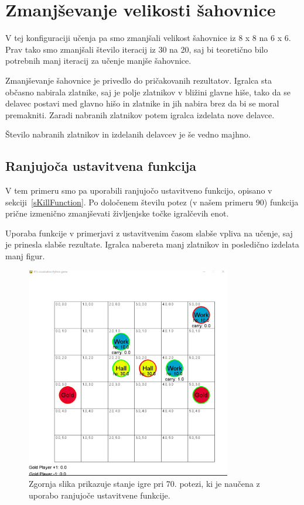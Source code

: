 \documentclass[a4paper, 12pt]{book}
\begin{document}
\section{Zmanjševanje velikosti šahovnice}
\label{resultFourth}

V tej konfiguraciji učenja pa smo zmanjšali velikost šahovnice iz 8 x 8 na 6 x 6.
Prav tako smo zmanjšali število iteracij iz 30 na 20, saj bi teoretično bilo potrebnih manj iteracij za učenje manjše šahovnice.

Zmanjševanje šahovnice je privedlo do pričakovanih rezultatov.
Igralca sta občasno nabirala zlatnike, saj je polje zlatnikov v bližini glavne hiše, tako da se delavec postavi med glavno hišo in zlatnike in jih nabira brez da bi se moral premakniti.
Zaradi nabranih zlatnikov potem igralca izdelata nove delavce.

Število nabranih zlatnikov in izdelanih delavcev je še vedno majhno.

\subsection{Ranjujoča ustavitvena funkcija}

V tem primeru smo pa uporabili ranjujočo ustavitveno funkcijo, opisano v sekciji~\ref{sKillFunction}.
Po določenem številu potez (v našem primeru 90) funkcija prične izmenično zmanjševati življenjske točke igralčevih enot.

Uporaba funkcije v primerjavi z ustavitvenim časom slabše vpliva na učenje, saj je prinesla slabše rezultate.
Igralca nabereta manj zlatnikov in posledično izdelata manj figur.



\begin{figure}[h]
	\begin{center}
		\includegraphics[width=0.8\textwidth]{photos/killFunction.pdf}
	\end{center}
	\caption{Zgornja slika prikazuje stanje igre pri 70. potezi, ki je naučena z uporabo ranjujoče ustavitvene funkcije.}
	\label{vizualizacijaRezultatovKillFunction}
\end{figure}
\end{document}
